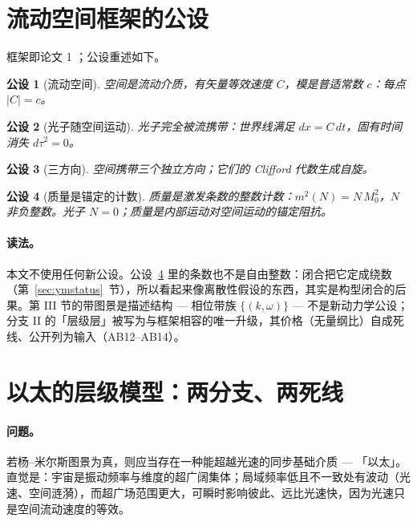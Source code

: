 \documentclass[aps,prd,preprint,superscriptaddress,amsmath,amssymb]{revtex4-2}
\newtheorem{postulate}{公设}[section]
\begin{document}
\section{流动空间框架的公设}
\label{sec:postulates}

框架即论文 1 \cite{ProjectionPhysics}；公设重述如下。

\begin{postulate}[流动空间]
\label{post:flowing}
空间是流动介质，有矢量等效速度 $C$，模是普适常数 $c$：每点 $|C|=c$。
\end{postulate}

\begin{postulate}[光子随空间运动]
\label{post:photon}
光子完全被流携带：世界线满足 $dx=C\,dt$，固有时间消失 $d\tau^2=0$。
\end{postulate}

\begin{postulate}[三方向]
\label{post:three}
空间携带三个独立方向；它们的 Clifford 代数生成自旋。
\end{postulate}

\begin{postulate}[质量是锚定的计数]
\label{post:mass}
质量是激发条数的整数计数\cite{planck1978gesetz,einstein1905erzeugung,de1924recherches}：$m^2(N)=N\,M_0^2$，$N$ 非负整数。光子 $N=0$；质量是内部运动对空间运动的锚定阻抗。
\end{postulate}

\paragraph{读法。}
本文不使用任何新公设。公设~\ref{post:mass} 里的条数也不是自由整数：闭合把它定成绕数（第~\ref{sec:ymstatus}~节），所以看起来像离散性假设的东西，其实是构型闭合的后果。第 III 节的带图景是描述结构 --- 相位带族 $\{(k,\omega)\}$ --- 不是新动力学公设；分支 II 的「层级层」被写为与框架相容的唯一升级，其价格（无量纲比）自成死线、公开列为输入（AB12--AB14）。

\section{以太的层级模型：两分支、两死线}
\label{sec:aether}

\paragraph{问题。}
若杨--米尔斯图景为真，则应当存在一种能超越光速的同步基础介质 --- 「以太」。直觉是：宇宙是振动频率与维度的超广阔集体；局域频率低且不一致处有波动（光速、空间涟漪），而超广场范围更大，可瞬时影响彼此、远比光速快，因为光速只是空间流动速度的等效。
\end{document}
